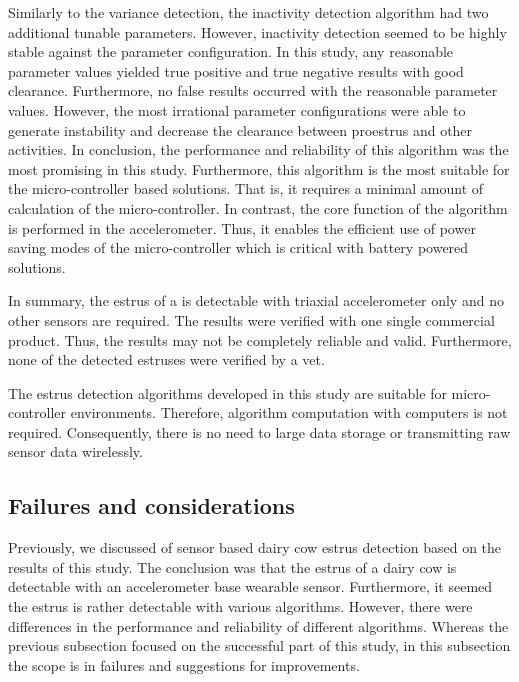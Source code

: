 \documentclass[english,12pt,a4paper,pdftex,elec,utf8]{aaltothesis}
\begin{document}
Similarly to the variance detection, the inactivity detection algorithm had two additional tunable parameters. However, inactivity detection seemed to be highly stable against the parameter configuration. In this study, any reasonable parameter values yielded true positive and true negative results with good clearance. Furthermore, no false results occurred with the reasonable parameter values. However, the most irrational parameter configurations were able to generate instability and decrease the clearance between proestrus and other activities. In conclusion, the performance and reliability of this algorithm was the most promising in this study. Furthermore, this algorithm is the most suitable for the micro-controller based solutions. That is, it requires a minimal amount of calculation of the micro-controller. In contrast, the core function of the algorithm is performed in the accelerometer. Thus, it enables the efficient use of power saving modes of the micro-controller which is critical with battery powered solutions. 


In summary, the estrus of a  is detectable with triaxial accelerometer only and no other sensors are required. The results were verified with one single commercial product. Thus, the results may not be completely reliable and valid. Furthermore, none of the detected estruses were verified by a vet.

The estrus detection algorithms developed in this study are suitable for micro-controller environments. Therefore, algorithm computation with computers is not required. Consequently, there is no need to large data storage or transmitting raw sensor data wirelessly.

\subsection{Failures and considerations}

Previously, we discussed of sensor based dairy cow estrus detection based on the results of this study. The conclusion was that the estrus of a dairy cow is detectable with an accelerometer base wearable sensor. Furthermore, it seemed the estrus is rather detectable with various algorithms. However, there were differences in the performance and reliability of different algorithms. Whereas the previous subsection focused on the successful part of this study, in this subsection the scope is in failures and suggestions for improvements.
\end{document}
